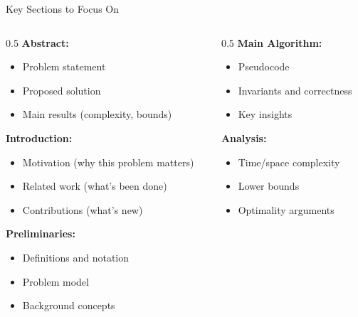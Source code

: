\documentclass[aspectratio=169,xcolor=dvipsnames]{beamer}
\begin{document}
\begin{frame}{Key Sections to Focus On}
  \begin{columns}
    \begin{column}{0.5\textwidth}
      \textbf{Abstract:}
      \begin{itemize}
        \item Problem statement
        \item Proposed solution
        \item Main results (complexity, bounds)
      \end{itemize}

      \vspace{0.2cm}
      \textbf{Introduction:}
      \begin{itemize}
        \item Motivation (why this problem matters)
        \item Related work (what's been done)
        \item Contributions (what's new)
      \end{itemize}

      \vspace{0.2cm}
      \textbf{Preliminaries:}
      \begin{itemize}
        \item Definitions and notation
        \item Problem model
        \item Background concepts
      \end{itemize}
    \end{column}

    \begin{column}{0.5\textwidth}
      \textbf{Main Algorithm:}
      \begin{itemize}
        \item Pseudocode
        \item Invariants and correctness
        \item Key insights
      \end{itemize}

      \vspace{0.2cm}
      \textbf{Analysis:}
      \begin{itemize}
        \item Time/space complexity
        \item Lower bounds
        \item Optimality arguments
      \end{itemize}


\end{column}
\end{columns}
\end{frame}
\end{document}
